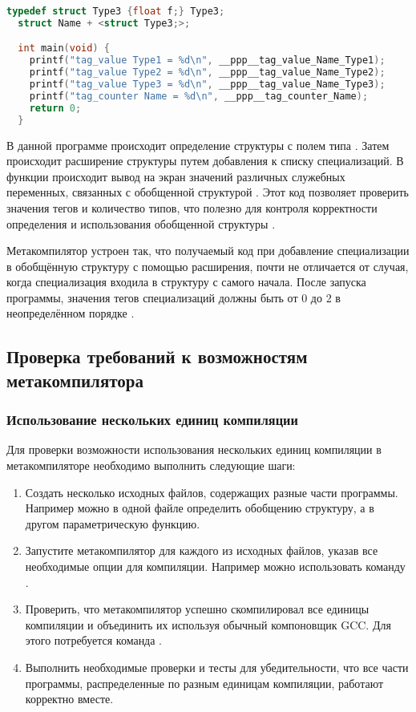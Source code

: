 \begin{lstlisting}[language=c, caption={Расширение структуры и вывод внутренних значений}, label={lst:extendstructallfancylike}]
  typedef struct Type3 {float f;} Type3;
  struct Name + <struct Type3;>;

  int main(void) {
    printf("tag_value Type1 = %d\n", __ppp__tag_value_Name_Type1);
    printf("tag_value Type2 = %d\n", __ppp__tag_value_Name_Type2);
    printf("tag_value Type3 = %d\n", __ppp__tag_value_Name_Type3);
    printf("tag_counter Name = %d\n", __ppp__tag_counter_Name);
    return 0;
  }
\end{lstlisting}
В данной программе происходит определение структуры  с полем типа .
Затем происходит расширение структуры  путем добавления  к списку специализаций.
В функции  происходит вывод на экран значений различных служебных переменных, связанных с обобщенной структурой .
Этот код позволяет проверить значения тегов и количество типов, что полезно для контроля корректности определения и использования обобщенной структуры .

Метакомпилятор устроен так, что получаемый код при добавление специализации в обобщённую структуру с помощью расширения, почти не отличается от случая, когда специализация входила в структуру с самого начала.
После запуска программы, значения тегов специализаций должны быть от 0 до 2 в неопределённом порядке
.

\subsection{Проверка требований к возможностям метакомпилятора}
\subsubsection{Использование нескольких единиц компиляции}
Для проверки возможности использования нескольких единиц компиляции в метакомпиляторе необходимо выполнить следующие шаги:
\begin{enumerate}
  \item Создать несколько исходных файлов, содержащих разные части программы.
  Например можно в одной файле определить обобщению структуру, а в другом параметрическую функцию.
  \item Запустите метакомпилятор для каждого из исходных файлов, указав все необходимые опции для компиляции.
  Например можно использовать команду .
  \item Проверить, что метакомпилятор успешно скомпилировал все единицы компиляции и объединить их используя обычный компоновщик GCC.
  Для этого потребуется команда .
  \item Выполнить необходимые проверки и тесты для убедительности, что все части программы, распределенные по разным единицам компиляции, работают корректно вместе.
\end{enumerate}

